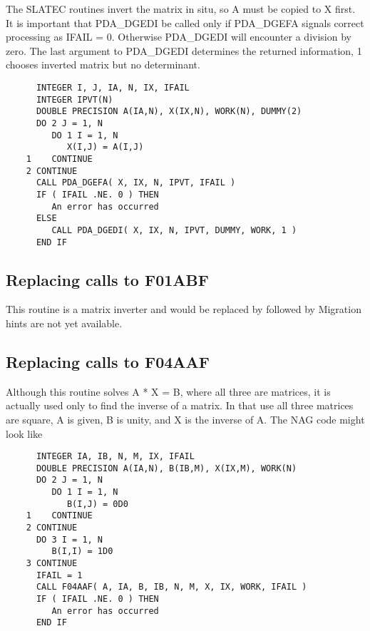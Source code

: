    The SLATEC routines invert the matrix in situ, so A must be copied to
   X first. It is important that PDA\_DGEDI be called only if PDA\_DGEFA
   signals correct processing as IFAIL = 0. Otherwise PDA\_DGEDI will
   encounter a division by zero. The last argument to PDA\_DGEDI
   determines the returned information, 1 chooses inverted matrix but no
   determinant.

\begin{verbatim}
      INTEGER I, J, IA, N, IX, IFAIL
      INTEGER IPVT(N)
      DOUBLE PRECISION A(IA,N), X(IX,N), WORK(N), DUMMY(2)
      DO 2 J = 1, N
         DO 1 I = 1, N
            X(I,J) = A(I,J)
    1    CONTINUE
    2 CONTINUE
      CALL PDA_DGEFA( X, IX, N, IPVT, IFAIL )
      IF ( IFAIL .NE. 0 ) THEN
         An error has occurred
      ELSE
         CALL PDA_DGEDI( X, IX, N, IPVT, DUMMY, WORK, 1 )
      END IF
\end{verbatim}


\subsection{Replacing calls to F01ABF}

   This routine is a matrix inverter and would be replaced
   by
   followed by
   Migration hints are not yet available.


\subsection{Replacing calls to F04AAF}

   Although this routine solves A * X = B, where all three are matrices,
   it is actually used only to find the inverse of a matrix. In that use
   all three matrices are square, A is given, B is unity, and X is the
   inverse of A. The NAG code might look like

\begin{verbatim}
      INTEGER IA, IB, N, M, IX, IFAIL
      DOUBLE PRECISION A(IA,N), B(IB,M), X(IX,M), WORK(N)
      DO 2 J = 1, N
         DO 1 I = 1, N
            B(I,J) = 0D0
    1    CONTINUE
    2 CONTINUE
      DO 3 I = 1, N
         B(I,I) = 1D0
    3 CONTINUE
      IFAIL = 1
      CALL F04AAF( A, IA, B, IB, N, M, X, IX, WORK, IFAIL )
      IF ( IFAIL .NE. 0 ) THEN
         An error has occurred
      END IF
\end{verbatim}

